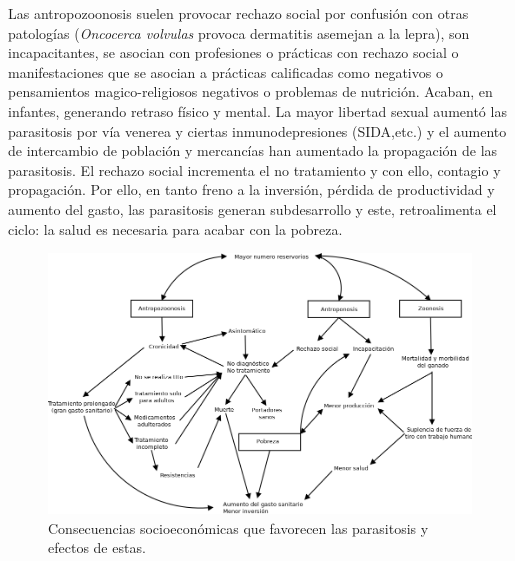 Las antropozoonosis suelen provocar rechazo social por confusión con otras patologías (\textit{Oncocerca volvulas} provoca dermatitis asemejan a la lepra), son incapacitantes, se asocian con profesiones o prácticas con rechazo social o manifestaciones que se asocian a prácticas calificadas como negativos o pensamientos magico-religiosos negativos o problemas de nutrición. Acaban, en infantes, generando retraso físico y mental. La mayor libertad sexual aumentó las parasitosis por vía venerea y ciertas inmunodepresiones (SIDA,etc.) y el aumento de intercambio de población y mercancías han aumentado la propagación de las parasitosis. El rechazo social incrementa el no tratamiento y con ello, contagio y propagación. Por ello, en tanto freno a la inversión, pérdida de productividad y aumento del gasto, las parasitosis generan subdesarrollo y este, retroalimenta el ciclo: la salud es necesaria para acabar con la pobreza.
\begin{figure}[H]
	\centering
	\includegraphics[width=\columnwidth]{A.imagenes/ACV-BioSan-Parasit-ImportSocioecon2}
	\caption[Consecuencias ampliadas de las parasitosis]{Consecuencias socioeconómicas que favorecen las parasitosis y efectos de estas.\label{fig:PARASIT:ConsecSocioecon2}}
\end{figure}